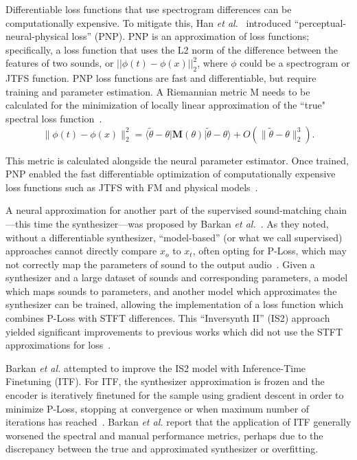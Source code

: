 Differentiable loss functions that use spectrogram differences can be computationally expensive. To mitigate this, Han \textit{et al.}~\cite{han2023perceptual} introduced ``perceptual-neural-physical loss'' (PNP). PNP is an approximation of loss functions; specifically, a loss function that uses the L2 norm of the difference between the features of two sounds, or $||\phi(t) - \phi(x)||^2_2$, where $\phi$ could be a spectrogram or JTFS function. PNP loss functions are fast and differentiable, but require training and parameter estimation. A Riemannian metric M needs to be calculated for the minimization of locally linear approximation of the ``true" spectral loss function~\cite{han2023perceptual}. 
\[
\|\phi(t) - \phi(x)\|_2^2 = \langle \tilde{\theta} - \theta | \mathbf{M}(\theta) | \tilde{\theta} - \theta \rangle + O(\|\tilde{\theta} - \theta\|_2^3). \tag{4}
\]

This metric is calculated alongside the neural parameter estimator. Once trained, PNP enabled the fast differentiable optimization of computationally expensive loss functions such as JTFS with FM and physical models~\cite{han2023perceptual,han2024learning}.

A neural approximation for another part of the supervised sound-matching chain---this time the synthesizer---was proposed by Barkan \textit{et al.}~\cite{barkan2023inversynthII}. As they noted, without a differentiable synthesizer, ``model-based'' (or what we call supervised) approaches cannot directly compare $x_o$ to $x_t$, often opting for P-Loss, which may not correctly map the parameters of sound to the output audio~\cite{esling2019flow,han2023perceptual,masuda2023improving}. Given a synthesizer and a large dataset of sounds and corresponding parameters, a model which maps sounds to parameters, and another model which approximates the synthesizer can be trained, allowing the implementation of a loss function which combines P-Loss with STFT differences. This ``Inversynth II'' (IS2) approach yielded significant improvements to previous works which did not use the STFT approximations for loss~\cite{esling2019flow,barkan2019inversynth}.

Barkan \textit{et al.} attempted to  improve the IS2 model with Inference-Time
Finetuning (ITF). For ITF, the synthesizer approximation is frozen and the encoder is iteratively finetuned for the sample using gradient descent in order to minimize P-Loss, stopping at convergence or when maximum number of iterations has reached~\cite{barkan2023inversynthII}. Barkan \textit{et al.} report that the application of ITF generally worsened the spectral and manual performance metrics, perhaps due to the discrepancy between the true and approximated synthesizer or overfitting.


